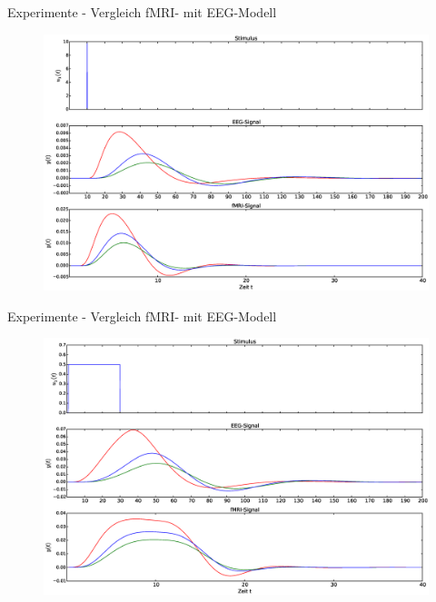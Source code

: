 \documentclass{beamer}
\begin{document}
\begin{frame}{Experimente - Vergleich fMRI- mit EEG-Modell}
\begin{figure}
\centering
\includegraphics[scale=0.25]{res/hemo-EEG-vergleich.eps}
\end{figure}
\end{frame}

\begin{frame}{Experimente - Vergleich fMRI- mit EEG-Modell}
\begin{figure}
\centering
\includegraphics[scale=0.25]{res/hemo-EEG-vergleich2.eps}
\end{figure}
\end{frame}
\end{document}
